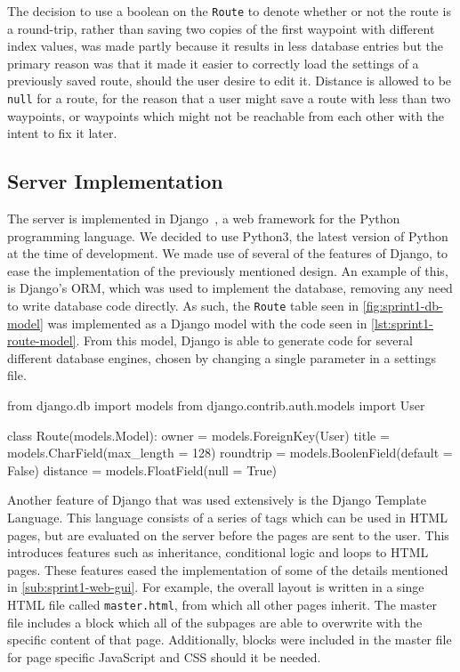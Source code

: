 The decision to use a boolean on the \texttt{Route} to denote whether or not the route is a round-trip, rather than saving two copies of the first waypoint with different index values, was made partly because it results in less database entries but the primary reason was that it made it easier to correctly load the settings of a previously saved route, should the user desire to edit it. Distance is allowed to be \texttt{null} for a route, for the reason that a user might save a route with less than two waypoints, or waypoints which might not be reachable from each other with the intent to fix it later.

\subsection{Server Implementation}

The server is implemented in Django~\citep{djangoproject}, a web framework for the Python programming language. We decided to use Python3, the latest version of Python at the time of development. We made use of several of the features of Django, to ease the implementation of the previously mentioned design. An example of this, is Django's \ac{ORM}, which was used to implement the database, removing any need to write database code directly. As such, the \texttt{Route} table seen in \autoref{fig:sprint1-db-model} was implemented as a Django model with the code seen in \autoref{lst:sprint1-route-model}. From this model, Django is able to generate code for several different database engines, chosen by changing a single parameter in a settings file.

\begin{code}[language={Python}, label={lst:sprint1-route-model}, caption={The ``Route'' Model}]
from django.db import models
from django.contrib.auth.models import User

class Route(models.Model):
	owner = models.ForeignKey(User)
	title = models.CharField(max_length = 128)
	roundtrip = models.BoolenField(default = False)
	distance = models.FloatField(null = True)
\end{code}

Another feature of Django that was used extensively is the Django Template Language. This language consists of a series of tags which can be used in \ac{HTML} pages, but are evaluated on the server before the pages are sent to the user. This introduces features such as inheritance, conditional logic and loops to \ac{HTML} pages. These features eased the implementation of some of the details mentioned in \autoref{sub:sprint1-web-gui}. For example, the overall layout is written in a singe \ac{HTML} file called \texttt{master.html}, from which all other pages inherit. The master file includes a block which all of the subpages are able to overwrite with the specific content of that page. Additionally, blocks were included in the master file for page specific JavaScript and \ac{CSS} should it be needed.


